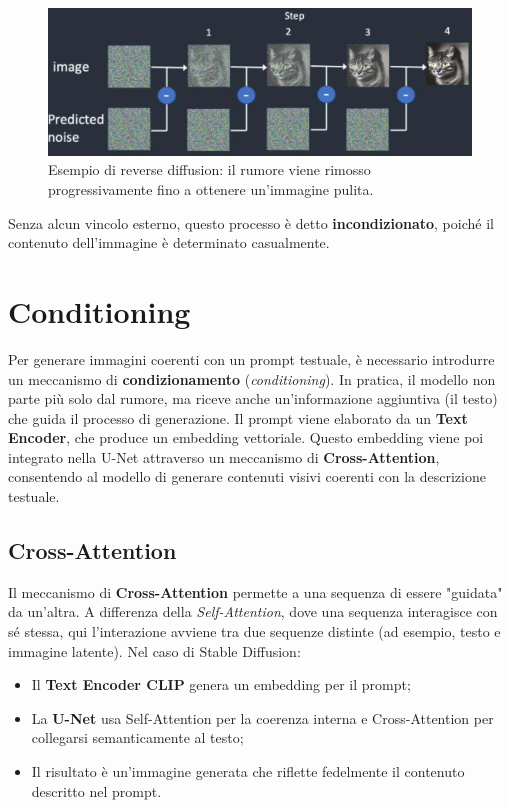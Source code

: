 \begin{figure}
    \centering
    \includegraphics[width=\textwidth]{figure/ReverseDiffusion.png}
    \caption{Esempio di reverse diffusion: il rumore viene rimosso progressivamente fino a ottenere un’immagine pulita.}
    \label{fig:revDiff}
\end{figure}
Senza alcun vincolo esterno, questo processo è detto \textbf{incondizionato}, poiché il contenuto dell’immagine è determinato casualmente.

\section{Conditioning}

Per generare immagini coerenti con un prompt testuale, è necessario introdurre un meccanismo di \textbf{condizionamento} (\textit{conditioning}). In pratica, il modello non parte più solo dal rumore, ma riceve anche un’informazione aggiuntiva (il testo) che guida il processo di generazione. Il prompt viene elaborato da un \textbf{Text Encoder}, che produce un embedding vettoriale. Questo embedding viene poi integrato nella U-Net attraverso un meccanismo di \textbf{Cross-Attention}, consentendo al modello di generare contenuti visivi coerenti con la descrizione testuale.

\subsection{Cross-Attention}
Il meccanismo di \textbf{Cross-Attention} permette a una sequenza di essere "guidata" da un’altra. A differenza della \textit{Self-Attention}, dove una sequenza interagisce con sé stessa, qui l’interazione avviene tra due sequenze distinte (ad esempio, testo e immagine latente). Nel caso di Stable Diffusion:

\begin{itemize}
    \item Il \textbf{Text Encoder CLIP} genera un embedding per il prompt;
    \item La \textbf{U-Net} usa Self-Attention per la coerenza interna e Cross-Attention per collegarsi semanticamente al testo;
    \item Il risultato è un’immagine generata che riflette fedelmente il contenuto descritto nel prompt.
\end{itemize}

